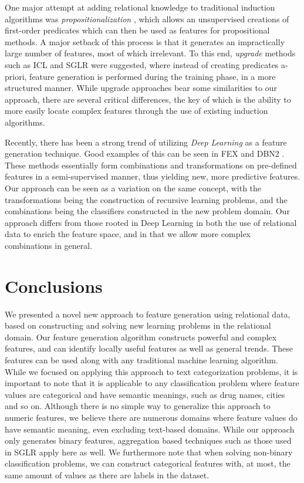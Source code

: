 \documentclass[twoside,11pt]{article}
\theoremstyle{definition}
\begin{document}
One major attempt at adding relational knowledge to traditional induction algorithms was \emph{propositionalization} \cite{kramer2000bottom}, which allows an unsupervised creations of first-order predicates which can then be used as features for propositional methods. A major setback of this process is that it generates an impractically large number of features, most of which irrelevant.  To this end, \emph{upgrade} methods such as ICL \cite{van2001upgrade} and SGLR \cite{popescul200716} were suggested, where instead of creating predicates a-priori, feature generation is performed during the training phase, in a more structured manner. While upgrade approaches bear some similarities to our approach, there are several critical differences, the key of which is the ability to more easily locate complex features through the use of existing induction algorithms.

Recently, there has been a strong trend of utilizing \emph{Deep Learning} \cite{lecun1998gradient,bengio2009learning} as a feature generation technique. Good examples of this can be seen in FEX \cite{plotz2011featurefull} and DBN2 \cite{kim2013deepfull}. These methods essentially form combinations and transformations on pre-defined features in a semi-supervised manner, thus yielding new, more predictive features. Our approach can be seen as a variation on the same concept, with the transformations being the construction of recursive learning problems, and the combinations being the classifiers constructed in the new problem domain. Our approach differs from those rooted in Deep Learning in both the use of relational data to enrich the feature space, and in that we allow more complex combinations in general.

\section{Conclusions}

We presented a novel new approach to feature generation using relational data, based on constructing and solving new learning problems in the relational domain. 
Our feature generation algorithm constructs powerful and complex features, and can identify locally useful features as well as general trends. These features can be used along with any traditional machine learning algorithm.
While we focused on applying this approach to text categorization problems, it is important to note that it is applicable to any classification problem where feature values are categorical and have semantic meanings, such as drug names, cities and so on. Although there is no simple way to generalize this approach to numeric features, we believe there are numerous domains where feature values do have semantic meaning, even excluding text-based domains.
While our approach only generates binary features, aggregation based techniques such as those used in SGLR apply here as well. We furthermore note that when solving non-binary classification problems, we can construct categorical features with, at most, the same amount of values as there are labels in the dataset.
\end{document}
